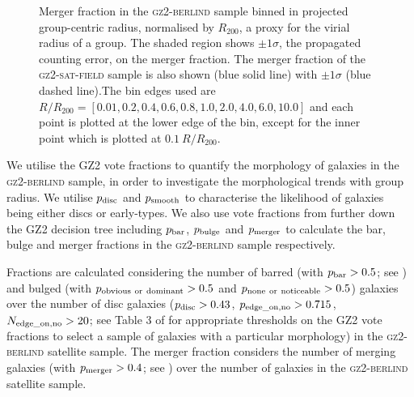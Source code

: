 \documentclass[useAMS,usenatbib]{mn2e}
\begin{document}
\begin{figure}
\caption[Merger fraction with group radius in the \textsc{gz2-berlind} sample]{Merger fraction in the \textsc{gz2-berlind} sample binned in projected group-centric radius, normalised by $R_{200}$, a proxy for the virial radius of a group. The shaded region shows $\pm1\sigma$, the propagated counting error, on the merger fraction. The merger fraction of the \textsc{gz2-sat-field} sample is also shown (blue solid line) with $\pm1\sigma$ (blue dashed line).The bin edges used are $R/R_{200} =  [0.01 ,   0.2,   0.4,   0.6,   0.8,   1.0 ,   2.0 ,   4.0 ,   6.0 ,  10.0]$ and each point is plotted at the lower edge of the bin, except for the inner point which is plotted at $0.1~R/R_{200}$.}
\label{fig:mergerradius}
\end{figure}


We utilise the GZ2 vote fractions to quantify the morphology of galaxies in the \textsc{gz2-berlind} sample, in order to investigate the morphological trends with group radius. We utilise $p_{\rm{disc}}$ and $p_{\rm{smooth}}$ to characterise the likelihood of galaxies being either discs or early-types. We also use vote fractions from further down the GZ2 decision tree including $p_{\rm{bar}}$, $p_{\rm{bulge}}$ and $p_{\rm{merger}}$ to calculate the bar, bulge and merger fractions in the \textsc{gz2-berlind} sample respectively. 

Fractions are calculated considering the number of barred (with $p_{\rm{bar}} > 0.5$; see \citealt{masters11a, Cheung13}) and bulged (with $p_{\rm{obvious}~\rm{or}~\rm{dominant}} > 0.5$ and $p_{\rm{none}~\rm{or}~\rm{noticeable}} > 0.5$) galaxies over the number of disc galaxies ($p_{\rm{disc}} > 0.43$, $p_{\rm{edge\_on, no}} > 0.715$, $N_{\rm{edge\_on, no}} > 20$; see Table 3 of \citealt{GZ2} for appropriate thresholds on the GZ2 vote fractions to select a sample of galaxies with a particular morphology) in the \textsc{gz2-berlind} satellite sample. The merger fraction considers the number of merging galaxies (with $p_{\rm{merger}} > 0.4$; see \citealt{Darg10a}) over the number of galaxies in the \textsc{gz2-berlind} satellite sample. 
\end{document}
